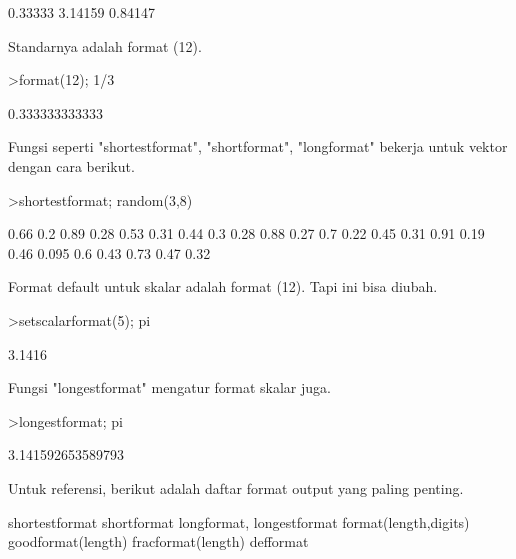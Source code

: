 \documentclass[a4paper,10pt]{article}
\begin{document}
\begin{eulernotebook}
\begin{euleroutput}
      0.33333 
      3.14159 
      0.84147 
\end{euleroutput}
\begin{eulercomment}
Standarnya adalah format (12).
\end{eulercomment}
\begin{eulerprompt}
>format(12); 1/3
\end{eulerprompt}
\begin{euleroutput}
  0.333333333333
\end{euleroutput}
\begin{eulercomment}
Fungsi seperti "shortestformat", "shortformat", "longformat" bekerja
untuk vektor dengan cara berikut.
\end{eulercomment}
\begin{eulerprompt}
>shortestformat; random(3,8)
\end{eulerprompt}
\begin{euleroutput}
    0.66    0.2   0.89   0.28   0.53   0.31   0.44    0.3 
    0.28   0.88   0.27    0.7   0.22   0.45   0.31   0.91 
    0.19   0.46  0.095    0.6   0.43   0.73   0.47   0.32 
\end{euleroutput}
\begin{eulercomment}
Format default untuk skalar adalah format (12). Tapi ini bisa diubah.
\end{eulercomment}
\begin{eulerprompt}
>setscalarformat(5); pi
\end{eulerprompt}
\begin{euleroutput}
  3.1416
\end{euleroutput}
\begin{eulercomment}
Fungsi "longestformat" mengatur format skalar juga.
\end{eulercomment}
\begin{eulerprompt}
>longestformat; pi
\end{eulerprompt}
\begin{euleroutput}
  3.141592653589793
\end{euleroutput}
\begin{eulercomment}
Untuk referensi, berikut adalah daftar format output yang paling
penting.

\end{eulercomment}
\begin{eulerttcomment}
 shortestformat shortformat longformat, longestformat
 format(length,digits) goodformat(length)
 fracformat(length)
 defformat
\end{eulerttcomment}
\begin{eulercomment}


\end{eulercomment}
\end{eulernotebook}
\end{document}
